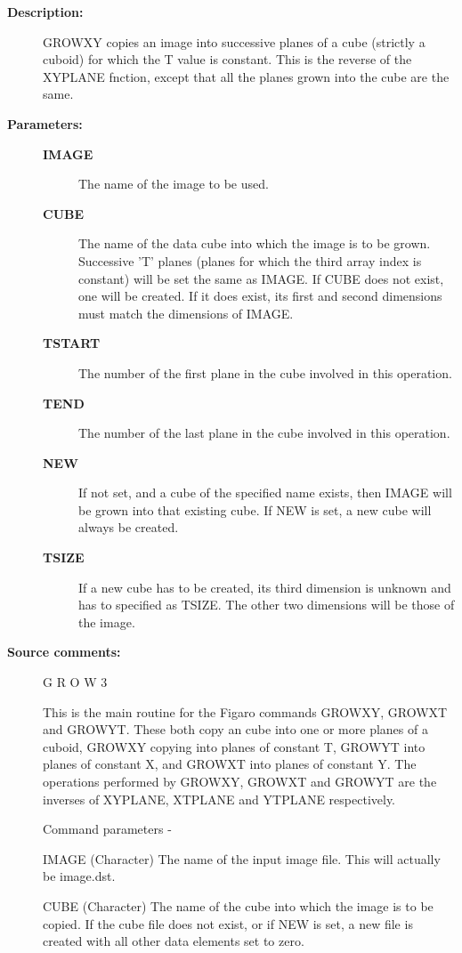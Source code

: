 \begin{description}
\begin{description}
\item [\textbf{Description:}]
 GROWXY copies an image into successive planes of a cube (strictly
 a cuboid) for which the T value is constant.  This is the reverse
 of the XYPLANE fnction, except that all the planes grown into the
 cube are the same.

\item [\textbf{Parameters:}]
\begin{description}
\item [\textbf{IMAGE}]
 The name of the image to be used.
\item [\textbf{CUBE}]
 The name of the data cube into which the image
 is to be grown.  Successive 'T' planes (planes for which
 the third array index is constant) will be set the same
 as IMAGE.  If CUBE does not exist, one will be created.
 If it does exist, its first and second dimensions must
 match the dimensions of IMAGE.
\item [\textbf{TSTART}]
 The number of the first plane in the cube
 involved in this operation.
\item [\textbf{TEND}]
 The number of the last plane in the cube
 involved in this operation.
\item [\textbf{NEW}]
 If not set, and a cube of the specified name exists,
 then IMAGE will be grown into that existing cube.
 If NEW is set, a new cube will always be created.
\item [\textbf{TSIZE}]
 If a new cube has to be created, its third dimension
 is unknown and has to specified as TSIZE.  The other
 two dimensions will be those of the image.
\end{description}

\item [\textbf{Source comments:}]
\begin{terminalv}
 G R O W 3

 This is the main routine for the Figaro commands GROWXY, GROWXT
 and GROWYT.  These both copy an cube into one or more
 planes of a cuboid, GROWXY copying into planes of constant T,
 GROWYT into planes of constant X, and GROWXT into planes of
 constant Y.  The operations performed by GROWXY, GROWXT and
 GROWYT are the inverses of XYPLANE, XTPLANE and YTPLANE
 respectively.

 Command parameters -

 IMAGE       (Character) The name of the input image file.
             This will actually be image.dst.

 CUBE        (Character) The name of the cube into which the
             image is to be copied.  If the cube file does
             not exist, or if NEW is set, a new file is
             created with all other data elements set to zero.


\end{terminalv}
\end{description}
\end{description}
